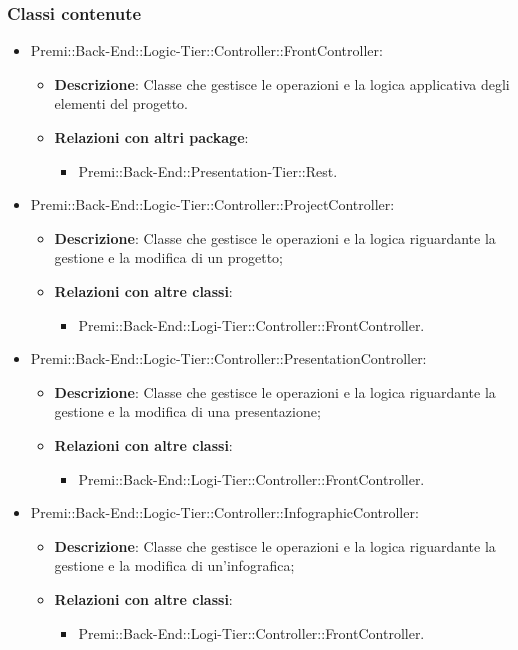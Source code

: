 	\subsubsection*{Classi contenute}
		\begin{itemize}
			\item Premi::Back-End::Logic-Tier::Controller::FrontController:
			\begin{itemize}
				\item \textbf{Descrizione}: Classe che gestisce le operazioni e la logica applicativa degli elementi del progetto.
				\item \textbf{Relazioni con altri package}:
				\begin{itemize}
					\item Premi::Back-End::Presentation-Tier::Rest.
				\end{itemize}
			\end{itemize}
			
			\item Premi::Back-End::Logic-Tier::Controller::ProjectController:
			\begin{itemize}
				\item \textbf{Descrizione}: Classe che gestisce le operazioni e la logica riguardante la gestione e la modifica di un progetto;
				\item \textbf{Relazioni con altre classi}:
				\begin{itemize}
					\item Premi::Back-End::Logi-Tier::Controller::FrontController.
				\end{itemize}
			\end{itemize}
			
			\item Premi::Back-End::Logic-Tier::Controller::PresentationController:
			\begin{itemize}
				\item \textbf{Descrizione}: Classe che gestisce le operazioni e la logica riguardante la gestione e la modifica di una presentazione;
				\item \textbf{Relazioni con altre classi}:
				\begin{itemize}
					\item Premi::Back-End::Logi-Tier::Controller::FrontController.
				\end{itemize}
			\end{itemize}
			
			\item Premi::Back-End::Logic-Tier::Controller::InfographicController:
			\begin{itemize}
				\item \textbf{Descrizione}: Classe che gestisce le operazioni e la logica riguardante la gestione e la modifica di un'infografica;
				\item \textbf{Relazioni con altre classi}:
				\begin{itemize}
					\item Premi::Back-End::Logi-Tier::Controller::FrontController.
				\end{itemize}
			\end{itemize}
			

\end{itemize}
